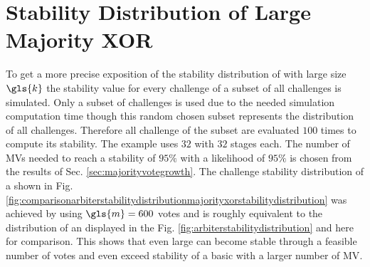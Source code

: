 \section{Stability Distribution of Large Majority \acs{XOR} \apufs}
\label{sec:distributionoflargemxpufs}

To get a more precise exposition of the stability distribution of \mxpufs with large size $\gls{k}$ the stability value for every challenge of a subset of all challenges is simulated.
Only a subset of challenges is used due to the needed simulation computation time though this random chosen subset represents the distribution of all challenges. 
Therefore all challenge of the subset are evaluated $100$ times to compute its stability.
The example uses $32$ \mpufs with $32$ stages each.
The number of \acp{MV} needed to reach a stability of $95 \%$ with a likelihood of $95 \%$ is chosen from the results of Sec. \ref{sec:majorityvotegrowth}.
The challenge stability distribution of a \mxpuf shown in Fig. \ref{fig:comparisonarbiterstabilitydistributionmajorityxorstabilitydistribution} was achieved by using $\gls{m} = 600$ votes and is roughly equivalent to the distribution of an \apuf displayed in the Fig. \ref{fig:arbiterstabilitydistribution} and here for comparison.
This shows that even large \mxpufs can become stable through a feasible number of votes and even exceed stability of a basic \apuf with a larger number of \ac{MV}.


